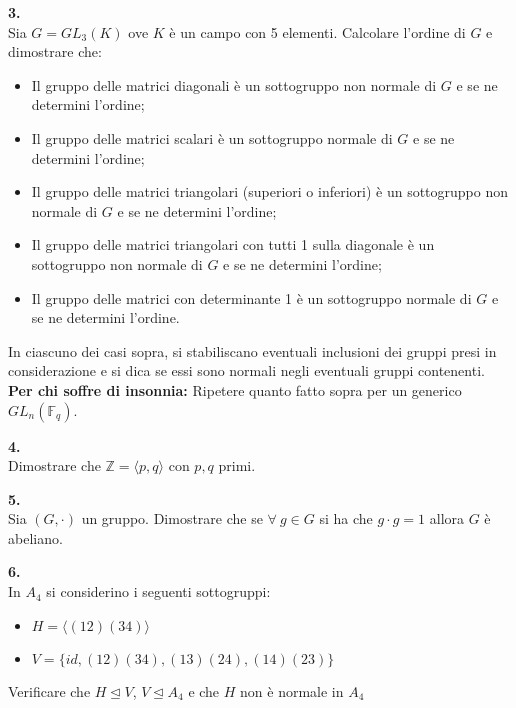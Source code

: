 \documentclass[italian,a4paper,11pt]
{article}
\newcommand{\Z}{\mathbb Z}
\newcommand{\acc}{\`}
\begin{document}
\vspace{0.4cm}
\noindent
\begin{Ex}\textbf{ 3.}\\
Sia $G=GL_3(K)$ ove $K$ \acc e un campo con 5 elementi. Calcolare l'ordine di $G$ e dimostrare che:
\begin{itemize}
\item Il gruppo delle matrici diagonali \acc e un sottogruppo non normale di $G$ e se ne determini l'ordine;

\item Il gruppo delle matrici scalari \acc e un sottogruppo
normale di $G$ e se ne determini l'ordine;

\item Il gruppo delle matrici triangolari (superiori o inferiori) \acc e un sottogruppo non normale di $G$ e se ne determini l'ordine;

\item Il gruppo delle matrici triangolari con tutti 1 sulla
diagonale \acc e un sottogruppo non normale di $G$ e se ne determini l'ordine;

\item Il gruppo delle matrici con determinante 1 \acc e un sottogruppo
normale di $G$ e se ne determini l'ordine.
\end{itemize}
In ciascuno dei casi sopra, si stabiliscano eventuali inclusioni dei gruppi
presi in considerazione e si dica se essi sono normali negli eventuali gruppi
contenenti.
\\
\textbf{Per chi soffre di insonnia:} Ripetere quanto fatto sopra per un generico $GL_n(\mathbb{F}_q)$.
\end{Ex}

\vspace{0.4cm}
\noindent
\begin{Ex}\textbf{ 4.}\\
Dimostrare che $\Z=\langle p, q \rangle$ con $p,q$ primi.
\end{Ex}

\vspace{0.4cm}
\noindent
\begin{Ex}\textbf{ 5.}\\
Sia $(G,\cdot)$ un gruppo. Dimostrare che se $\forall \ g \in G$ si ha che $g\cdot g=1$ allora $G$ \acc e abeliano.
\end{Ex}

\vspace{0.4cm}
\noindent
\begin{Ex}\textbf{ 6.}\\
In $A_4$ si considerino i seguenti sottogruppi:
\begin{itemize}
\item $H=\langle(12)(34)\rangle$
\item $V=\{id,(12)(34),(13)(24),(14)(23)\}$
\end{itemize}
Verificare che $H\unlhd V$, $V\unlhd A_4$ e che $H$ non \acc e normale in $A_4$
\end{Ex}
\end{document}
